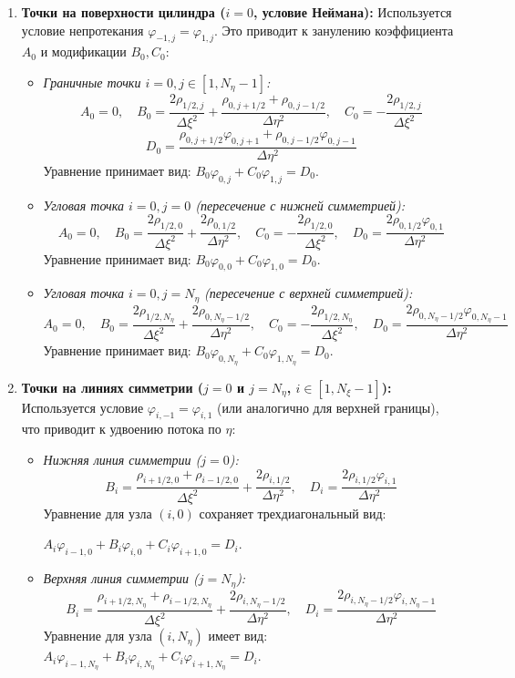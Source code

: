 	\begin{enumerate}
		\item \textbf{Точки на поверхности цилиндра ($i=0$, условие Неймана):} 
		Используется условие непротекания $\varphi_{-1,j} = \varphi_{1,j}$. Это приводит к занулению коэффициента $A_0$ и модификации $B_0, C_0$:
		\begin{itemize}
			\item \textit{Граничные точки $i=0, j \in [1, N_\eta-1]$:}
			\[ A_0 = 0, \quad B_0 = \frac{2\rho_{1/2,j}}{\Delta \xi^2} + \frac{\rho_{0,j+1/2} + \rho_{0,j-1/2}}{\Delta \eta^2}, \quad C_0 = -\frac{2\rho_{1/2,j}}{\Delta \xi^2} \]
			\[ D_0 = \frac{\rho_{0,j+1/2} \varphi_{0,j+1} + \rho_{0,j-1/2} \varphi_{0,j-1}}{\Delta \eta^2} \]
			Уравнение принимает вид: $B_0 \varphi_{0,j} + C_0 \varphi_{1,j} = D_0$.
			
			\item \textit{Угловая точка $i=0, j=0$ (пересечение с нижней симметрией):}
			\[ A_0 = 0, \quad B_0 = \frac{2\rho_{1/2,0}}{\Delta \xi^2} + \frac{2\rho_{0,1/2}}{\Delta \eta^2}, \quad C_0 = -\frac{2\rho_{1/2,0}}{\Delta \xi^2}, \quad D_0 = \frac{2\rho_{0,1/2} \varphi_{0,1}}{\Delta \eta^2} \]
			Уравнение принимает вид: $B_0 \varphi_{0,0} + C_0 \varphi_{1,0} = D_0$.
			
			\item \textit{Угловая точка $i=0, j=N_\eta$ (пересечение с верхней симметрией):}
			\[ A_0 = 0, \quad B_0 = \frac{2\rho_{1/2,N_\eta}}{\Delta \xi^2} + \frac{2\rho_{0,N_\eta-1/2}}{\Delta \eta^2}, \quad C_0 = -\frac{2\rho_{1/2,N_\eta}}{\Delta \xi^2}, \quad D_0 = \frac{2\rho_{0,N_\eta-1/2} \varphi_{0,N_\eta-1}}{\Delta \eta^2} \]
			Уравнение принимает вид: $B_0 \varphi_{0,N_\eta} + C_0 \varphi_{1,N_\eta} = D_0$.
		\end{itemize}

		\item \textbf{Точки на линиях симметрии ($j=0$ и $j=N_\eta$, $i \in [1, N_\xi-1]$):} 
		Используется условие $\varphi_{i,-1} = \varphi_{i,1}$ (или аналогично для верхней границы), что приводит к удвоению потока по $\eta$:
		\begin{itemize}
			\item \textit{Нижняя линия симметрии ($j=0$):}
			\[ B_i = \frac{\rho_{i+1/2,0} + \rho_{i-1/2,0}}{\Delta \xi^2} + \frac{2\rho_{i,1/2}}{\Delta \eta^2}, \quad D_i = \frac{2\rho_{i,1/2} \varphi_{i,1}}{\Delta \eta^2} \]
			Уравнение для узла $(i,0)$ сохраняет трехдиагональный вид: 
			
			$A_i \varphi_{i-1,0} + B_i \varphi_{i,0} + C_i \varphi_{i+1,0} = D_i$.
			\item \textit{Верхняя линия симметрии ($j=N_\eta$):}
			\[ B_i = \frac{\rho_{i+1/2,N_\eta} + \rho_{i-1/2,N_\eta}}{\Delta \xi^2} + \frac{2\rho_{i,N_\eta-1/2}}{\Delta \eta^2}, \quad D_i = \frac{2\rho_{i,N_\eta-1/2} \varphi_{i,N_\eta-1}}{\Delta \eta^2} \]
			Уравнение для узла $(i,N_\eta)$ имеет вид: $A_i \varphi_{i-1,N_\eta} + B_i \varphi_{i,N_\eta} + C_i \varphi_{i+1,N_\eta} = D_i$.
		\end{itemize}


\end{enumerate}
